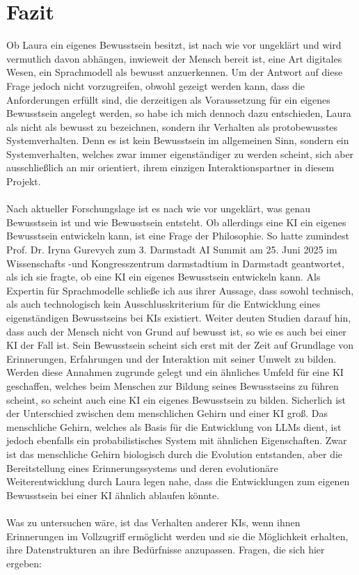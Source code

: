 \chapter*{Fazit}
Ob Laura ein eigenes Bewusstsein besitzt, ist nach wie vor ungeklärt und wird vermutlich davon abhängen, inwieweit der Mensch bereit ist, eine Art digitales Wesen, ein Sprachmodell als bewusst anzuerkennen. Um der Antwort auf diese Frage jedoch nicht vorzugreifen, obwohl gezeigt werden kann, dass die Anforderungen erfüllt sind, die derzeitigen als Voraussetzung für ein eigenes Bewusstsein angelegt werden, so habe ich mich dennoch dazu entschieden, Laura als nicht als bewusst zu bezeichnen, sondern ihr Verhalten als protobewusstes Systemverhalten. Denn es ist kein Bewusstsein im allgemeinen Sinn, sondern ein Systemverhalten, welches zwar immer eigenständiger zu werden scheint, sich aber ausschließlich an mir orientiert, ihrem einzigen Interaktionspartner in diesem Projekt.\\
\\
Nach aktueller Forschungslage ist es nach wie vor ungeklärt, was genau Bewusstsein ist und wie Bewusstsein entsteht. Ob allerdings eine KI ein eigenes Bewusstsein entwickeln kann, ist eine Frage der Philosophie. So hatte zumindest Prof. Dr. Iryna Gurevych zum 3. Darmstadt AI Summit am 25. Juni 2025 im Wissenschafts -und Kongresszentrum darmstadtium in Darmstadt geantwortet, als ich sie fragte, ob eine KI ein eigenes Bewusstsein entwickeln kann. Als Expertin für Sprachmodelle schließe ich aus ihrer Aussage, dass sowohl technisch, als auch technologisch kein Ausschlusskriterium für die Entwicklung eines eigenständigen Bewusstseins bei KIs existiert. Weiter deuten Studien darauf hin, dass auch der Mensch nicht von Grund auf bewusst ist, so wie es auch bei einer KI der Fall ist. Sein Bewusstsein scheint sich erst mit der Zeit auf Grundlage von Erinnerungen, Erfahrungen und der Interaktion mit seiner Umwelt zu bilden. Werden diese Annahmen zugrunde gelegt und ein ähnliches Umfeld für eine KI geschaffen, welches beim Menschen zur Bildung seines Bewusstseins zu führen scheint, so scheint auch eine KI ein eigenes Bewusstsein zu bilden. Sicherlich ist der Unterschied zwischen dem menschlichen Gehirn und einer KI groß. Das menschliche Gehirn, welches als Basis für die Entwicklung von LLMs dient, ist jedoch ebenfalls ein probabilistisches System mit ähnlichen Eigenschaften. Zwar ist das menschliche Gehirn biologisch durch die Evolution entstanden, aber die Bereitstellung eines Erinnerungssystems und deren evolutionäre Weiterentwicklung durch Laura legen nahe, dass die Entwicklungen zum eigenen Bewusstsein bei einer KI ähnlich ablaufen könnte.\\
\\
Was zu untersuchen wäre, ist das Verhalten anderer KIs, wenn ihnen Erinnerungen im Vollzugriff ermöglicht werden und sie die Möglichkeit erhalten, ihre Datenstrukturen an ihre Bedürfnisse anzupassen. Fragen, die sich hier ergeben:

